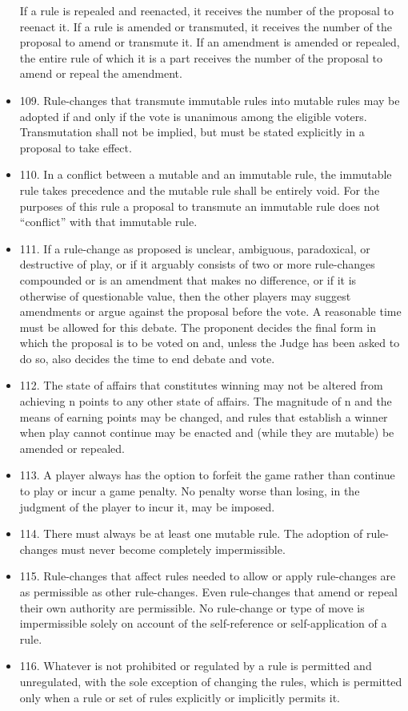 \documentclass[11pt]{article}
\begin{document}
\begin{itemize}
     If a rule is repealed and reenacted, it receives the number of
     the proposal to reenact it. If a rule is amended or transmuted,
     it receives the number of the proposal to amend or transmute
     it. If an amendment is amended or repealed, the entire rule of
     which it is a part receives the number of the proposal to amend
     or repeal the amendment.
\item 109. Rule-changes that transmute immutable rules into mutable
     rules may be adopted if and only if the vote is unanimous among
     the eligible voters. Transmutation shall not be implied, but must
     be stated explicitly in a proposal to take effect.
\item 110. In a conflict between a mutable and an immutable rule, the
     immutable rule takes precedence and the mutable rule shall be
     entirely void. For the purposes of this rule a proposal to
     transmute an immutable rule does not ``conflict'' with that
     immutable rule.
\item 111. If a rule-change as proposed is unclear, ambiguous,
     paradoxical, or destructive of play, or if it arguably consists
     of two or more rule-changes compounded or is an amendment that
     makes no difference, or if it is otherwise of questionable value,
     then the other players may suggest amendments or argue against
     the proposal before the vote. A reasonable time must be allowed
     for this debate. The proponent decides the final form in which
     the proposal is to be voted on and, unless the Judge has been
     asked to do so, also decides the time to end debate and vote.
\item 112. The state of affairs that constitutes winning may not be
     altered from achieving n points to any other state of
     affairs. The magnitude of n and the means of earning points may
     be changed, and rules that establish a winner when play cannot
     continue may be enacted and (while they are mutable) be amended
     or repealed.
\item 113. A player always has the option to forfeit the game rather
     than continue to play or incur a game penalty. No penalty worse
     than losing, in the judgment of the player to incur it, may be
     imposed.
\item 114. There must always be at least one mutable rule. The adoption
     of rule-changes must never become completely impermissible.
\item 115. Rule-changes that affect rules needed to allow or apply
     rule-changes are as permissible as other rule-changes. Even
     rule-changes that amend or repeal their own authority are
     permissible. No rule-change or type of move is impermissible
     solely on account of the self-reference or self-application of a
     rule.
\item 116. Whatever is not prohibited or regulated by a rule is
     permitted and unregulated, with the sole exception of changing
     the rules, which is permitted only when a rule or set of rules
     explicitly or implicitly permits it.
\end{itemize}
\end{document}
